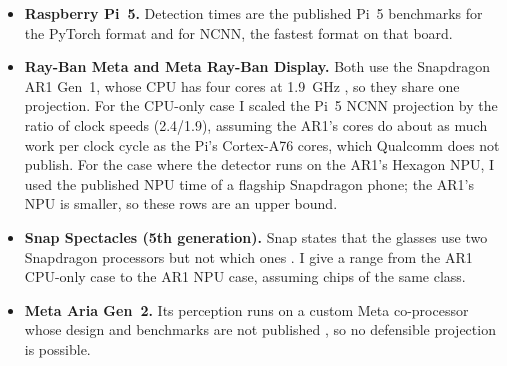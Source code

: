 \begin{itemize}
  \item \textbf{Raspberry Pi~5.} Detection times are the published Pi~5 benchmarks for the
        PyTorch format and for NCNN, the fastest format on that board.
  \item \textbf{Ray-Ban Meta and Meta Ray-Ban Display.} Both use the Snapdragon AR1 Gen~1,
        whose CPU has four cores at 1.9~GHz \cite{qcom_ar1}, so they share one projection.
        For the CPU-only case I scaled the Pi~5 NCNN projection by the ratio of clock
        speeds (2.4/1.9), assuming the AR1's cores do about as much work per clock cycle as
        the Pi's Cortex-A76 cores, which Qualcomm does not publish. For the case where the
        detector runs on the AR1's Hexagon NPU, I used the published NPU time of a flagship
        Snapdragon phone; the AR1's NPU is smaller, so these rows are an upper bound.
  \item \textbf{Snap Spectacles (5th generation).} Snap states that the glasses use two
        Snapdragon processors but not which ones \cite{spectacles5}. I give a range from the
        AR1 CPU-only case to the AR1 NPU case, assuming chips of the same class.
  \item \textbf{Meta Aria Gen~2.} Its perception runs on a custom Meta co-processor whose
        design and benchmarks are not published \cite{aria2}, so no defensible projection is
        possible.
\end{itemize}

